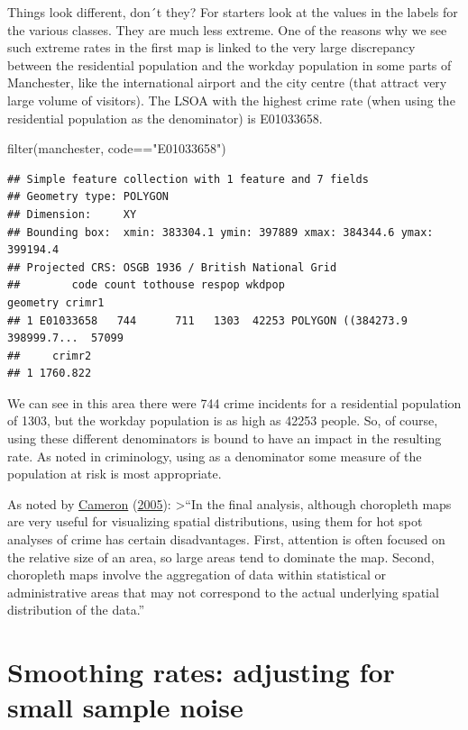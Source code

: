 \documentclass[
]{book}
\newenvironment{Shaded}{\begin{snugshade}}{\end{snugshade}}
\newcommand{\FunctionTok}[1]{\textcolor[rgb]{0.00,0.00,0.00}{#1}}
\newcommand{\NormalTok}[1]{#1}
\newcommand{\SpecialCharTok}[1]{\textcolor[rgb]{0.00,0.00,0.00}{#1}}
\newcommand{\StringTok}[1]{\textcolor[rgb]{0.31,0.60,0.02}{#1}}
\begin{document}
Things look different, don´t they? For starters look at the values in the labels for the various classes. They are much less extreme. One of the reasons why we see such extreme rates in the first map is linked to the very large discrepancy between the residential population and the workday population in some parts of Manchester, like the international airport and the city centre (that attract very large volume of visitors). The LSOA with the highest crime rate (when using the residential population as the denominator) is E01033658.

\begin{Shaded}
\begin{Highlighting}[]
\FunctionTok{filter}\NormalTok{(manchester, code}\SpecialCharTok{==}\StringTok{"E01033658"}\NormalTok{)}
\end{Highlighting}
\end{Shaded}

\begin{verbatim}
## Simple feature collection with 1 feature and 7 fields
## Geometry type: POLYGON
## Dimension:     XY
## Bounding box:  xmin: 383304.1 ymin: 397889 xmax: 384344.6 ymax: 399194.4
## Projected CRS: OSGB 1936 / British National Grid
##        code count tothouse respop wkdpop                       geometry crimr1
## 1 E01033658   744      711   1303  42253 POLYGON ((384273.9 398999.7...  57099
##     crimr2
## 1 1760.822
\end{verbatim}

We can see in this area there were 744 crime incidents for a residential population of 1303, but the workday population is as high as 42253 people. So, of course, using these different denominators is bound to have an impact in the resulting rate. As noted in criminology, using as a denominator some measure of the population at risk is most appropriate.

As noted by \protect\hyperlink{ref-Cameron_2005}{Cameron} (\protect\hyperlink{ref-Cameron_2005}{2005}):
\textgreater{}``In the final analysis, although choropleth maps are very useful for visualizing spatial distributions, using them for hot spot analyses of crime has certain disadvantages. First, attention is often focused on the relative size of an area, so large areas tend to dominate the map. Second, choropleth maps involve the aggregation of data within statistical or administrative areas that may not correspond to the actual underlying spatial distribution of the data.''

\hypertarget{smoothing-rates-adjusting-for-small-sample-noise}{%
\section{Smoothing rates: adjusting for small sample noise}\label{smoothing-rates-adjusting-for-small-sample-noise}}
\end{document}
